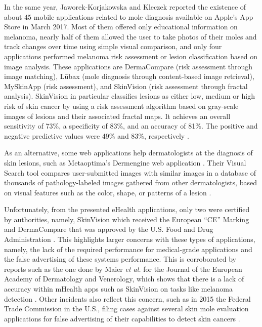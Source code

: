     In the same year, Jaworek-Korjakowska and Kleczek \cite{Jaworek-Korjakowska2018} reported the existence of about 45 mobile applications related to mole diagnosis available on Apple’s App Store in March 2017. Most of them offered only educational information on melanoma, nearly half of them allowed the user to take photos of their moles and track changes over time using simple visual comparison, and only four applications performed melanoma risk assessment or lesion classification based on image analysis. These applications are DermaCompare (risk assessment through image matching), Lūbax (mole diagnosis through content-based image retrieval), MySkinApp (risk assessment), and SkinVision (risk assessment through fractal analysis). SkinVision in particular classifies lesions as either low, medium or high risk of skin cancer by using a risk assessment algorithm based on gray-scale images of lesions and their associated fractal maps. It achieves an overall sensitivity of 73\%, a specificity of 83\%, and an accuracy of 81\%. The positive and negative predictive values were 49\% and 83\%, respectively \cite{Jaworek-Korjakowska2018}.
    
    As an alternative, some web applications help dermatologists at the diagnosis of skin lesions, such as Metaoptima's Dermengine web application \cite{dermengine}. Their Visual Search tool compares user-submitted images with similar images in a database of thousands of pathology-labeled images gathered from other dermatologists, based on visual features such as the color, shape, or patterns of a lesion \cite{dermengine}. \par
    
    Unfortunately, from the presented eHealth applications, only two were certified by authorities, namely, SkinVision which received the European “CE” Marking and DermaCompare that was approved by the U.S. Food and Drug Administration \cite{Jaworek-Korjakowska2018}. This highlights larger concerns with these types of applications, namely, the lack of the required performance for medical-grade applications and the false advertising of these systems performance. This is corroborated by reports such as the one done by Maier \textit{et al.} for the Journal of the European Academy of Dermatology and Venerology, which shows that there is a lack of accuracy within mHealth apps such as SkinVision on tasks like melanoma detection \cite{Maier2015}. Other incidents also reflect this concern, such as in 2015 the Federal Trade Commission in the U.S., filing cases against several skin mole evaluation applications for false advertising of their capabilities to detect skin cancers \cite{ftc}. \par

